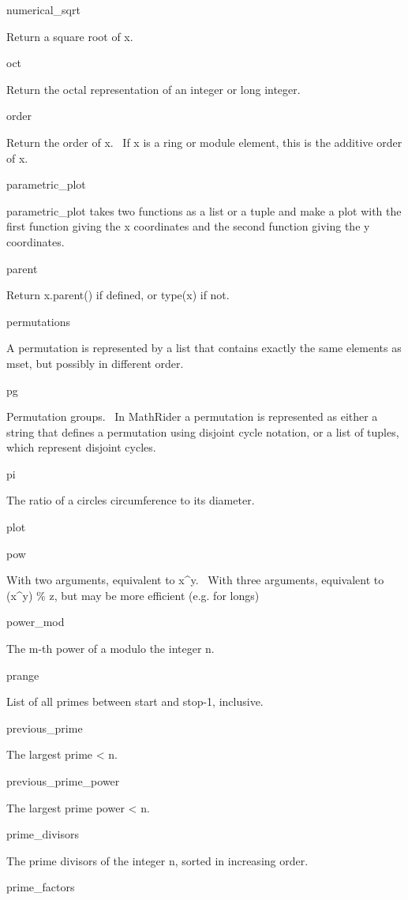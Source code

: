 \documentclass[12pt,twoside]{book}
\begin{document}
numerical\_sqrt

Return a square root of x.

oct

Return the octal representation of an integer or long integer.

order

Return the order of x. \ If x is a ring or module element, this is the
additive order of x.

parametric\_plot

parametric\_plot takes two functions as a list or a tuple and make a
plot with the first function giving the x coordinates and the second
function giving the y coordinates.

parent

Return x.parent() if defined, or type(x) if not.

permutations

A permutation is represented by a list that contains exactly the same
elements as mset, but possibly in different order.

pg

Permutation groups. \ In MathRider a permutation is represented as
either a string that defines a permutation using disjoint cycle
notation, or a list of tuples, which represent disjoint cycles.

pi

The ratio of a circle{\textquotesingle}s circumference to its diameter.

plot


\bigskip

pow

With two arguments, equivalent to x\^{}y. \ With three arguments,
equivalent to (x\^{}y) \% z, but may be more efficient (e.g. for longs)

power\_mod

The m{}-th power of a modulo the integer n.

prange

List of all primes between start and stop{}-1, inclusive.

previous\_prime

The largest prime {\textless} n.

previous\_prime\_power

The largest prime power {\textless} n.

prime\_divisors

The prime divisors of the integer n, sorted in increasing order.

prime\_factors
\end{document}
